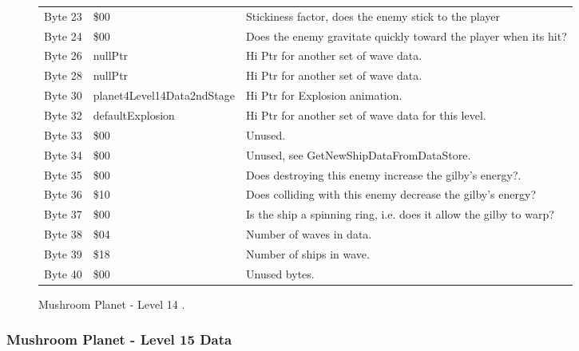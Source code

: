 \begin{figure}[H]
{\begin{adjustbox}{width=12cm}
\begin{tabular}{lll}
 Byte 23 & \$00                        & Stickiness factor, does the enemy stick to the player              \\
 Byte 24 & \$00                        & Does the enemy gravitate quickly toward the player when its hit?   \\
 Byte 26 & nullPtr                    & Hi Ptr for another set of wave data.                               \\
 Byte 28 & nullPtr                    & Hi Ptr for another set of wave data.                               \\
 Byte 30 & planet4Level14Data2ndStage & Hi Ptr for Explosion animation.                                    \\
 Byte 32 & defaultExplosion           & Hi Ptr for another set of wave data for this level.                \\
 Byte 33 & \$00                        & Unused.                                                            \\
 Byte 34 & \$00                        & Unused, see GetNewShipDataFromDataStore.                           \\
 Byte 35 & \$00                        & Does destroying this enemy increase the gilby's energy?.           \\
 Byte 36 & \$10                        & Does colliding with this enemy decrease the gilby's energy?        \\
 Byte 37 & \$00                        & Is the ship a spinning ring, i.e. does it allow the gilby to warp? \\
 Byte 38 & \$04                        & Number of waves in data.                                           \\
 Byte 39 & \$18                        & Number of ships in wave.                                           \\
 Byte 40 & \$00                        & Unused bytes.                                                      \\
\bottomrule
\end{tabular}

  \end{adjustbox}

  }\caption*{Mushroom Planet - Level 14
.}
\end{figure}

\clearpage
\subsubsection{Mushroom Planet - Level 15 Data}

